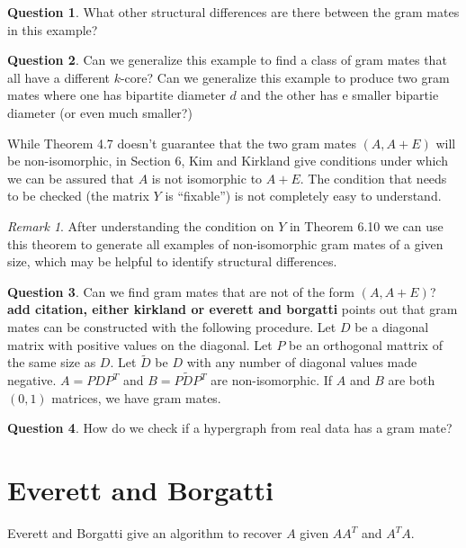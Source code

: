 \documentclass[11pt]{article}
\theoremstyle{definition}
\newtheorem{question}{Question}
\theoremstyle{remark}
\newtheorem{remark}{Remark}
\begin{document}
\begin{question}
What other structural differences are there between the gram mates in this example?
\end{question}

\begin{question}
Can we generalize this example to find a class of gram mates that all have a different $k$-core?
Can we generalize this example to produce two gram mates where one has bipartite diameter $d$ and the other has e smaller bipartie diameter (or even much smaller?)
\end{question}


While Theorem 4.7 doesn't guarantee that the two gram mates $(A, A+E)$ will be non-isomorphic, in Section 6, Kim and Kirkland give conditions under which we can be assured that $A$ is not isomorphic to $A+E$. The condition that needs to be checked (the matrix $Y$ is ``fixable'') is not completely easy to understand. 

\begin{remark}
After understanding the condition on $Y$ in Theorem 6.10 we can use this theorem to generate all examples of non-isomorphic gram mates of a given size, which may be helpful to identify structural differences. 
\end{remark}

\begin{question}
Can we find gram mates that are not of the form $(A, A+E)$? 
{\bf add citation, either kirkland or everett and borgatti} points out that gram mates can be constructed with the following procedure. Let $D$ be a diagonal matrix with positive values on the diagonal. Let $P$ be an orthogonal mattrix of the same size as $D$. Let $\tilde{D}$ be $D$ with any number of diagonal values made negative. 
 $A = PDP^{T}$ and $B = P\widetilde{D}P^{T}$ are non-isomorphic. If $A$ and $B$ are both $(0, 1)$ matrices, we have gram mates.
\end{question}

\begin{question}
How do we check if a hypergraph from real data has a gram mate?
\end{question}
\section{Everett and Borgatti}

Everett and Borgatti \cite{Everett} give an algorithm to recover $A$ given $AA^{T}$ and $A^{T}A$.
\end{document}
